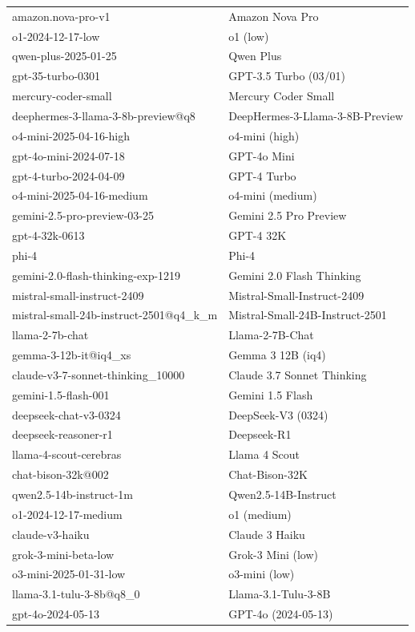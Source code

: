 \documentclass[11pt]{article}
\begin{document}
\begin{table}[htbp]
{\begin{tabular}{ll}
amazon.nova-pro-v1 & Amazon Nova Pro \\
o1-2024-12-17-low & o1 (low) \\
qwen-plus-2025-01-25 & Qwen Plus \\
gpt-35-turbo-0301 & GPT-3.5 Turbo (03/01) \\
mercury-coder-small & Mercury Coder Small \\
deephermes-3-llama-3-8b-preview@q8 & DeepHermes-3-Llama-3-8B-Preview \\
o4-mini-2025-04-16-high & o4-mini (high) \\
gpt-4o-mini-2024-07-18 & GPT-4o Mini \\
gpt-4-turbo-2024-04-09 & GPT-4 Turbo \\
o4-mini-2025-04-16-medium & o4-mini (medium) \\
gemini-2.5-pro-preview-03-25 & Gemini 2.5 Pro Preview \\
gpt-4-32k-0613 & GPT-4 32K \\
phi-4 & Phi-4 \\
gemini-2.0-flash-thinking-exp-1219 & Gemini 2.0 Flash Thinking \\
mistral-small-instruct-2409 & Mistral-Small-Instruct-2409 \\
mistral-small-24b-instruct-2501@q4\_k\_m & Mistral-Small-24B-Instruct-2501 \\
llama-2-7b-chat & Llama-2-7B-Chat \\
gemma-3-12b-it@iq4\_xs & Gemma 3 12B (iq4) \\
claude-v3-7-sonnet-thinking\_10000 & Claude 3.7 Sonnet Thinking \\
gemini-1.5-flash-001 & Gemini 1.5 Flash \\
deepseek-chat-v3-0324 & DeepSeek-V3 (0324) \\
deepseek-reasoner-r1 & Deepseek-R1 \\
llama-4-scout-cerebras & Llama 4 Scout \\
chat-bison-32k@002 & Chat-Bison-32K \\
qwen2.5-14b-instruct-1m & Qwen2.5-14B-Instruct \\
o1-2024-12-17-medium & o1 (medium) \\
claude-v3-haiku & Claude 3 Haiku \\
grok-3-mini-beta-low & Grok-3 Mini (low) \\
o3-mini-2025-01-31-low & o3-mini (low) \\
llama-3.1-tulu-3-8b@q8\_0 & Llama-3.1-Tulu-3-8B \\
gpt-4o-2024-05-13 & GPT-4o (2024-05-13) \\

\end{tabular}}
\end{table}
\end{document}
